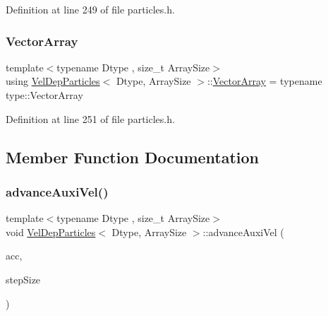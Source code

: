Definition at line 249 of file particles.\+h.

\mbox{\label{class_vel_dep_particles_ae3b026c9c67249406954e22b5b09f607}} 
\subsubsection{\texorpdfstring{Vector\+Array}{VectorArray}}
{\footnotesize\ttfamily template$<$typename Dtype , size\+\_\+t Array\+Size$>$ \\
using \mbox{\hyperlink{class_vel_dep_particles}{Vel\+Dep\+Particles}}$<$ Dtype, Array\+Size $>$\+::\mbox{\hyperlink{class_vel_indep_particles_a27580f65b6523bfb6900520af2e44708}{Vector\+Array}} =  typename type\+::\+Vector\+Array}



Definition at line 251 of file particles.\+h.



\subsection{Member Function Documentation}
\mbox{\label{class_vel_dep_particles_a01ef2a76b8cb3b53eb92e41104a3df6f}} 
\subsubsection{\texorpdfstring{advance\+Auxi\+Vel()}{advanceAuxiVel()}}
{\footnotesize\ttfamily template$<$typename Dtype , size\+\_\+t Array\+Size$>$ \\
void \mbox{\hyperlink{class_vel_dep_particles}{Vel\+Dep\+Particles}}$<$ Dtype, Array\+Size $>$\+::advance\+Auxi\+Vel (\begin{DoxyParamCaption}\item[{const \mbox{\hyperlink{class_vel_indep_particles_a27580f65b6523bfb6900520af2e44708}{Vector\+Array}} \&}]{acc,  }\item[{\mbox{\hyperlink{class_vel_indep_particles_a5d275b22f0d759f360ddd80e78f4b466}{Scalar}}}]{step\+Size }\end{DoxyParamCaption})\hspace{0.3cm}{\ttfamily [inline]}}



